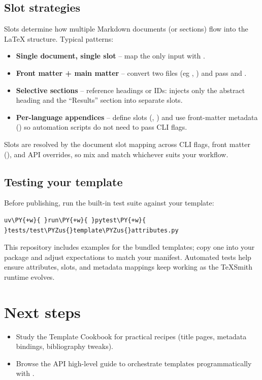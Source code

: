 \documentclass[a4paper,twoside]{article}
\begin{document}
\subsection{Slot strategies}
Slots determine how multiple Markdown documents (or sections) flow into the
\LaTeX{} structure. Typical patterns:
\begin{itemize}
\item \textbf{Single document, single slot} -- map the only input with .
\item \textbf{Front matter + main matter} -- convert two files (eg ,
) and pass  and .
\item \textbf{Selective sections} -- reference headings or IDs:
 injects
only the abstract heading and the ``Results'' section into separate slots.
\item \textbf{Per-language appendices} -- define slots (, ) and use front-matter metadata () so automation scripts do not need to pass CLI flags.
\end{itemize}
Slots are resolved by the document slot mapping across CLI flags, front matter (), and API overrides, so mix and match whichever suits your workflow.
\subsection{Testing your template}
Before publishing, run the built-in test suite against your template:
\begin{tscode}[lang=bash, engine=pygments]
\begin{Verbatim}[commandchars=\\\{\},breaklines, breakanywhere, commandchars=\\\{\}]
uv\PY{+w}{ }run\PY{+w}{ }pytest\PY{+w}{ }tests/test\PYZus{}template\PYZus{}attributes.py
\end{Verbatim}
\end{tscode}
This repository includes examples for the bundled templates; copy one into your package and adjust expectations to match your manifest. Automated tests help ensure attributes, slots, and metadata mappings keep working as the TeXSmith runtime evolves.
\section{Next steps}
\begin{itemize}
\item Study the Template Cookbook for practical recipes (title pages, metadata bindings, bibliography tweaks).
\item Browse the API high-level guide to orchestrate templates programmatically with .
\end{itemize}
\end{document}
